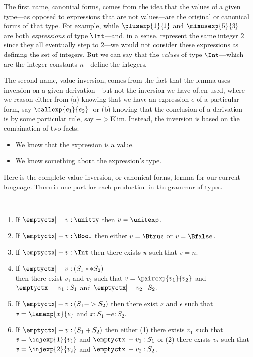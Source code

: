 The first name, canonical forms, comes from the idea that the values of a given type---as opposed
to expressions that are not values---are the original or canonical forms of that type.
For example, while $\plusexp{1}{1}$ and $\minusexp{5}{3}$
are both \emph{expressions} of type
$\Int$---and, in a sense, represent the same integer $2$ since they all eventually step
to $2$---we would not consider these expressions as defining the set of integers.
But we can say that the \emph{values} of type $\Int$---which are the integer constants $n$---define the integers.

The second name, value inversion, comes from the fact that the lemma
uses inversion on a given derivation---but not the inversion we have often used,
where we reason either from (a) knowing that we have an expression $e$
of a particular form, say $\callexp{e_1}{e_2}$, or (b) knowing that the conclusion
of a derivation is by some particular rule, say $->$Elim.
Instead, the inversion is based on the combination of two facts:

\begin{itemize}
\item We know that the expression is a value.
\item We know something about the expression's type.
\end{itemize}

Here is the complete value inversion, or canonical forms, lemma for our current language.
There is one part for each production in the grammar of types.

\begin{lemma} \label{lem:value-inversion}
    ~
  \begin{enumerate}
  \item If $\emptyctx |- v : \unitty$
    then $v = \unitexp$.

  \item If $\emptyctx |- v : \Bool$
    then either $v = \Btrue$ or $v = \Bfalse$.

  \item If $\emptyctx |- v : \Int$
    then there exists $n$ such that $v = n$.
    
  \item If $\emptyctx |- v : (S_1 ** S_2)$
    \\
    then there exist $v_1$ and $v_2$ such that
    $v = \pairexp{v_1}{v_2}$
    and $\emptyctx |- v_1 : S_1$
    and $\emptyctx |- v_2 : S_2$.

  \item If $\emptyctx |- v : (S_1 -> S_2)$
    then there exist $x$ and $e$ such that
    $v = \lamexp{x}{e}$
    and $x : S_1 |- e : S_2$.

  \item If $\emptyctx |- v : (S_1 + S_2)$
    then either (1) there exists $v_1$ such that $v = \injexp{1}{v_1}$
    and $\emptyctx |- v_1 : S_1$
    or (2) there exists $v_2$ such that $v = \injexp{2}{v_2}$
    and $\emptyctx |- v_2 : S_2$.
  \end{enumerate}
\end{lemma}


